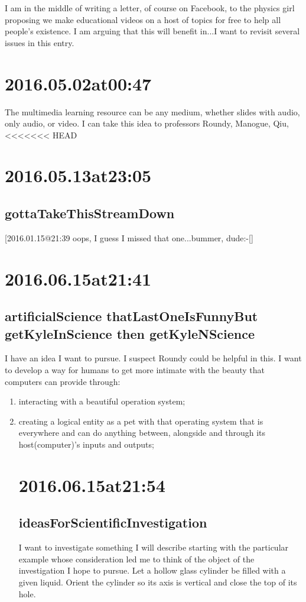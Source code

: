 \begin{enumerate}
I am in the middle of writing a letter, of course on Facebook, to the physics girl proposing we make educational videos on a host of topics for free to help all people's existence. I am arguing that this will benefit in...I want to revisit several issues in this entry. 

\section*{ 2016.05.02at00:47 }
The multimedia learning resource can be any medium, whether slides with audio, only audio, or video. I can take this idea to professors Roundy, Manogue, Qiu, 
<<<<<<< HEAD

\section*{ 2016.05.13at23:05 }
\subsection*{ gottaTakeThisStreamDown }
[2016.01.15@21:39 oops, I guess I missed that one...bummer, dude:-[]


\section*{ 2016.06.15at21:41 }
\subsection*{ artificialScience thatLastOneIsFunnyBut getKyleInScience then getKyleNScience }
I have an idea I want to pursue.
I suspect Roundy could be helpful in this.
I want to develop a way for humans to get more intimate with the beauty that computers can provide through:
\begin{enumerate}
\item interacting with a beautiful operation system;
\item creating a logical entity as a pet with that operating system that is everywhere and can do anything between, alongside and through its host(computer)'s inputs and outputs;

\section*{ 2016.06.15at21:54 }
\subsection*{ ideasForScientificInvestigation }
I want to investigate something I will describe starting with the particular example whose consideration led me to think of the object of the investigation I hope to pursue.
Let a hollow glass cylinder be filled with a given liquid.
Orient the cylinder so its axis is vertical and close the top of its hole.


\end{enumerate}
\end{enumerate}
